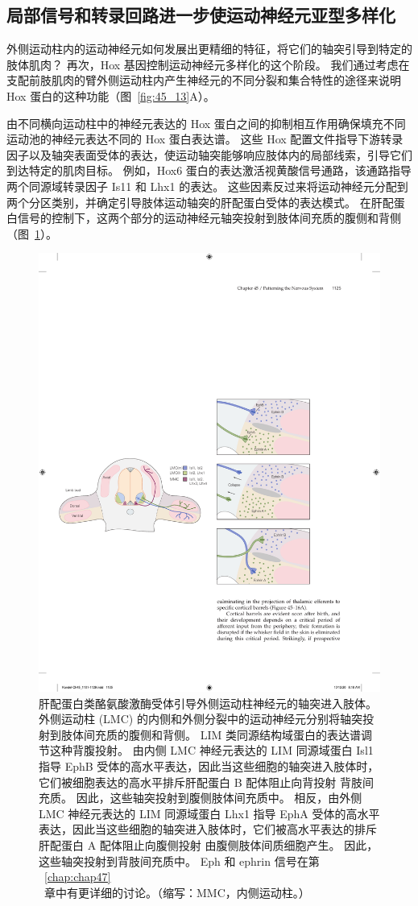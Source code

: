 \subsection{局部信号和转录回路进一步使运动神经元亚型多样化}

外侧运动柱内的运动神经元如何发展出更精细的特征，将它们的轴突引导到特定的肢体肌肉？
再次，Hox 基因控制运动神经元多样化的这个阶段。
我们通过考虑在支配前肢肌肉的臂外侧运动柱内产生神经元的不同分裂和集合特性的途径来说明 Hox 蛋白的这种功能（图~\ref{fig:45_13}A）。


由不同横向运动柱中的神经元表达的 Hox 蛋白之间的抑制相互作用确保填充不同运动池的神经元表达不同的 Hox 蛋白表达谱。
这些 Hox 配置文件指导下游转录因子以及轴突表面受体的表达，使运动轴突能够响应肢体内的局部线索，引导它们到达特定的肌肉目标。
例如，Hox6 蛋白的表达激活视黄酸信号通路，该通路指导两个同源域转录因子 Is11 和 Lhx1 的表达。
这些因素反过来将运动神经元分配到两个分区类别，并确定引导肢体运动轴突的肝配蛋白受体的表达模式。
在肝配蛋白信号的控制下，这两个部分的运动神经元轴突投射到肢体间充质的腹侧和背侧（图~\ref{fig:45_14}）。


\begin{figure}[htbp]
	\centering
	\includegraphics[width=0.65\linewidth]{chap45/fig_45_14}
	\caption{肝配蛋白类酪氨酸激酶受体引导外侧运动柱神经元的轴突进入肢体。 外侧运动柱 (LMC) 的内侧和外侧分裂中的运动神经元分别将轴突投射到肢体间充质的腹侧和背侧。 LIM 类同源结构域蛋白的表达谱调节这种背腹投射。 由内侧 LMC 神经元表达的 LIM 同源域蛋白 Isl1 指导 EphB 受体的高水平表达，因此当这些细胞的轴突进入肢体时，它们被细胞表达的高水平排斥肝配蛋白 B 配体阻止向背投射 背肢间充质。 因此，这些轴突投射到腹侧肢体间充质中。 相反，由外侧 LMC 神经元表达的 LIM 同源域蛋白 Lhx1 指导 EphA 受体的高水平表达，因此当这些细胞的轴突进入肢体时，它们被高水平表达的排斥肝配蛋白 A 配体阻止向腹侧投射 由腹侧肢体间质细胞产生。 因此，这些轴突投射到背肢间充质中。 Eph 和 ephrin 信号在第 ~\ref{chap:chap47}~章中有更详细的讨论。（缩写：MMC，内侧运动柱。）}
	\label{fig:45_14}
\end{figure}


